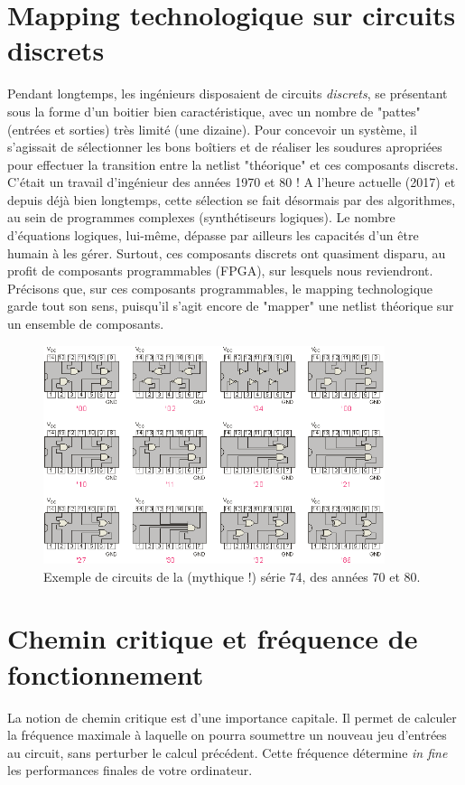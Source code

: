 \section{Mapping technologique sur circuits discrets}
Pendant longtemps, les ingénieurs disposaient de circuits {\it discrets}, se présentant sous la forme d'un boitier bien caractéristique, avec un nombre
de "pattes" (entrées et sorties) très limité (une dizaine). Pour concevoir un système, il s'agissait de sélectionner les bons boîtiers et de réaliser les soudures
apropriées pour effectuer la transition entre la netlist "théorique" et ces composants discrets. C'était un travail d'ingénieur des années 1970 et 80 !
A l'heure actuelle (2017) et depuis déjà bien longtemps, cette sélection se fait désormais par des algorithmes, au sein de programmes complexes (synthétiseurs logiques). Le nombre d'équations logiques, lui-même,
dépasse par ailleurs les capacités d'un être humain à les gérer. Surtout, ces composants discrets ont quasiment disparu, au profit de composants programmables (FPGA),
sur lesquels nous reviendront. Précisons que, sur ces composants programmables, le mapping
technologique garde tout son sens, puisqu'il s'agit encore de "mapper" une netlist théorique sur un ensemble de composants.

\begin{figure}[htb!]
  \centering
  \includegraphics[width=10cm]{./figures/paste_image31.png}
  \caption{Exemple de circuits de la (mythique !) série 74, des années 70 et 80.}
\end{figure}


\section{Chemin critique et fréquence de fonctionnement}
La notion de chemin critique est d'une importance capitale. Il permet de calculer la fréquence maximale à laquelle on pourra soumettre un nouveau jeu d'entrées au circuit, sans perturber le calcul précédent. Cette fréquence
détermine {\it in fine} les performances finales de votre ordinateur.\\

